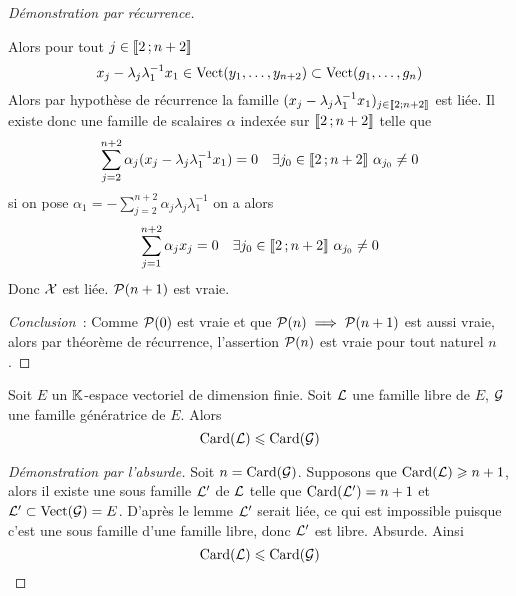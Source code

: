 \begin{proof}[Démonstration par récurrence]
\begin{enumerate}
      Alors pour tout \(j \in \intervalleentier{2}{n+2}\)
      \begin{equation}
        x_j - \lambda_j\lambda_1^{-1}x_1 \in \VectEngendre(y_1, \ldots, y_{n+2})
        \subset \VectEngendre(g_1, \ldots, g_n)
      \end{equation}
      Alors par hypothèse de récurrence la famille
      \((x_j-\lambda_j\lambda_1^{-1}x_1)_{j \in \intervalleentier{2}{n+2}}\) est
      liée. Il existe donc une famille de scalaires \(\alpha\) indexée sur
      \(\intervalleentier{2}{n+2}\) telle que
      \begin{equation}
        \sum_{j=2}^{n+2} \alpha_j (x_j-\lambda_j\lambda_1^{-1}x_1) = 0 \quad
        \exists j_0 \in \intervalleentier{2}{n+2} \ \alpha_{j_0} \neq 0
      \end{equation}
      si on pose \(\alpha_1=-\sum_{j=2}^{n+2} \alpha_j \lambda_j
      \lambda_1^{-1}\) on a alors
      \begin{equation}
        \sum_{j=1}^{n+2} \alpha_j x_j =0 \quad \exists j_0 \in
        \intervalleentier{2}{n+2} \ \alpha_{j_0} \neq 0
      \end{equation}
      Donc \(\X\) est liée. \(\P(n+1)\) est vraie.
  \end{enumerate}

  \emph{Conclusion}~: Comme \(\P(0)\) est vraie et que \(\P(n) \implies
  \P(n+1)\) est aussi vraie, alors par théorème de récurrence, l'assertion
  \(\P(n)\) est vraie pour tout naturel \(n\).
\end{proof}

\begin{cor}
  Soit \(E\) un \(\K\)-espace vectoriel de dimension finie. Soit \(\Lb\) une
  famille libre de \(E\), \(\G\) une famille génératrice de \(E\). Alors
  \begin{equation}
    \Card(\Lb) \leqslant \Card(\G)
  \end{equation}
\end{cor}
\begin{proof}[Démonstration par l'absurde]
  Soit \(n = \Card(\G)\). Supposons que \(\Card(\Lb) \geqslant n+1\), alors il
  existe une sous famille \(\Lb'\) de \(\Lb\) telle que \(\Card(\Lb')=n+1\) et
  \(\Lb' \subset \VectEngendre(\G)=E\). D'après le lemme \(\Lb'\) serait liée,
  ce qui est impossible puisque c'est une sous famille d'une famille libre, donc
  \(\Lb'\) est libre. Absurde.  Ainsi \begin{equation}
    \Card(\Lb) \leqslant \Card(\G)
  \end{equation}
\end{proof}


